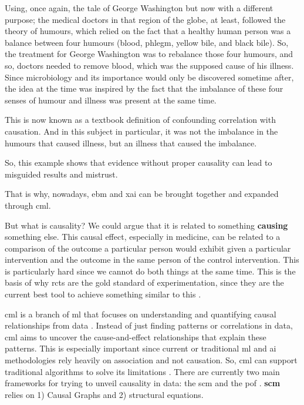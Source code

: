 
Using, once again, the tale of George Washington but now with a different purpose; the medical doctors in that region of the globe, at least, followed the theory of humours, which relied on the fact that a healthy human person was a balance between four humours (blood, phlegm, yellow bile, and black bile). So, the treatment for George Washington was to rebalance those four humours, and so, doctors needed to remove blood, which was the supposed cause of his illness. Since microbiology and its importance would only be discovered sometime after, the idea at the time was inspired by the fact that the imbalance of these four senses of humour and illness was present at the same time.

This is now known as a textbook definition of confounding correlation with causation. And in this subject in particular, it was not the imbalance in the humours that caused illness, but an illness that caused the imbalance.

So, this example shows that evidence without proper causality can lead to misguided results and mistrust.

That is why, nowadays, \ac{ebm} and \ac{xai} can be brought together and expanded through \ac{cml}.

But what is causality? We could argue that it is related to something \textbf{causing} something else. This causal effect, especially in medicine, can be related to a comparison of the outcome a particular person would exhibit given a particular intervention and the outcome in the same person of the control intervention. This is particularly hard since we cannot do both things at the same time. This is the basis of why \acp{rct} are the gold standard of experimentation, since they are the current best tool to achieve something similar to this \cite{10.7551/mitpress/14244.001.0001}.


\ac{cml} is a branch of \ac{ml} that focuses on understanding and quantifying causal relationships from data \cite{hernanDefinitionCausalEffect2004}. Instead of just finding patterns or correlations in data, \ac{cml} aims to uncover the cause-and-effect relationships that explain these patterns.
This is especially important since current or traditional \ac{ml} and \ac{ai} methodologies rely heavily on association and not causation. So, \ac{cml} can support traditional algorithms to solve its limitations \cite{pearlTheoreticalImpedimentsMachine2018}.
There are currently two main frameworks for trying to unveil causality in data: the \ac{scm}  and the \ac{pof} \cite{shiLearningCausalEffects2022b}. \textbf{\ac{scm}} relies on 1) Causal Graphs and 2) structural equations.

